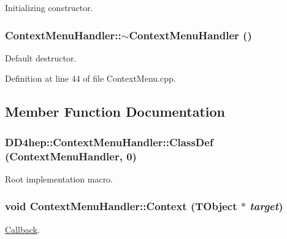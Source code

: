 Initializing constructor. \hypertarget{class_d_d4hep_1_1_context_menu_handler_aa44899588abd2731d4e38a6a80bd8443}{
\subsubsection[{$\sim$ContextMenuHandler}]{\setlength{\rightskip}{0pt plus 5cm}ContextMenuHandler::$\sim$ContextMenuHandler ()}}
\label{class_d_d4hep_1_1_context_menu_handler_aa44899588abd2731d4e38a6a80bd8443}


Default destructor. 

Definition at line 44 of file ContextMenu.cpp.

\subsection{Member Function Documentation}
\hypertarget{class_d_d4hep_1_1_context_menu_handler_a1464908be325d3eef9a71cffa57d0968}{
\subsubsection[{ClassDef}]{\setlength{\rightskip}{0pt plus 5cm}DD4hep::ContextMenuHandler::ClassDef ({\bf ContextMenuHandler}, \/  0)}}
\label{class_d_d4hep_1_1_context_menu_handler_a1464908be325d3eef9a71cffa57d0968}


Root implementation macro. \hypertarget{class_d_d4hep_1_1_context_menu_handler_a1e8043084d74ec968d010d6d7452f56b}{
\subsubsection[{Context}]{\setlength{\rightskip}{0pt plus 5cm}void ContextMenuHandler::Context ({\bf TObject} $\ast$ {\em target})}}
\label{class_d_d4hep_1_1_context_menu_handler_a1e8043084d74ec968d010d6d7452f56b}


\hyperlink{class_d_d4hep_1_1_callback}{Callback}. 

